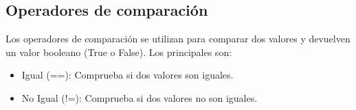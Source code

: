 \newpage
  
\subsection{Operadores de comparación}
Los operadores de comparación se utilizan para comparar dos valores y devuelven un valor booleano (True o False). 
Los principales son:

\begin{itemize}
    \item Igual (==): Comprueba si dos valores son iguales.
    \begin{figure}[h]
      \centering
    \end{figure}
\newpage
    \item No Igual (!=): Comprueba si dos valores no son iguales.
    \begin{figure}[h]
      \centering
    \end{figure}


\end{itemize}
